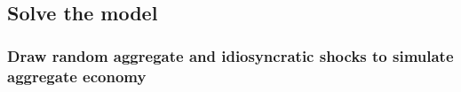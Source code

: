 \documentclass[11pt]{article}
\begin{document}
    \begin{center}
    \end{center}
    { \hspace*{\fill} \\}
    
    \hypertarget{solve-the-model}{%
\subsection{Solve the model}\label{solve-the-model}}

    \hypertarget{draw-random-aggregate-and-idiosyncratic-shocks-to-simulate-aggregate-economy}{%
\subsubsection{Draw random aggregate and idiosyncratic shocks to
simulate aggregate
economy}\label{draw-random-aggregate-and-idiosyncratic-shocks-to-simulate-aggregate-economy}}
\end{document}
